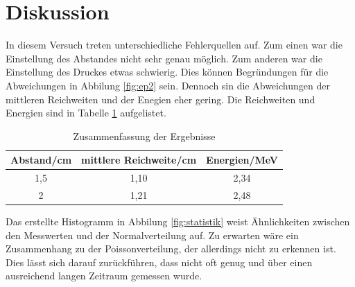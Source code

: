 \section{Diskussion}

In diesem Versuch treten unterschiedliche Fehlerquellen auf.
Zum einen war die Einstellung des Abstandes nicht sehr genau möglich.
Zum anderen war die Einstellung des Druckes etwas schwierig.
Dies können Begründungen für die Abweichungen in Abbilung \ref{fig:ep2} sein.
Dennoch sin die Abweichungen der mittleren Reichweiten und der Enegien eher gering.
Die Reichweiten und Energien sind in Tabelle \ref{tab:4} aufgelistet.

\begin{table}
  \centering
  \caption{Zusammenfassung der Ergebnisse}
  \label{tab:4}
  \begin{tabular}{c c c}
    \toprule
    Abstand/cm & mittlere Reichweite/cm &  Energien/MeV \\
    \midrule
    1,5& 1,10 & 2,34 \\
    2 & 1,21 & 2,48 \\
    \bottomrule
  \end{tabular}
\end{table}

Das erstellte Histogramm in Abbilung \ref{fig:statistik} weist Ähnlichkeiten zwischen
den Messwerten und der Normalverteilung auf.
Zu erwarten wäre ein Zusammenhang zu der Poissonverteilung, der allerdings nicht zu erkennen ist.
Dies lässt sich darauf zurückführen, dass nicht oft genug
 und über einen ausreichend langen Zeitraum gemessen wurde.
